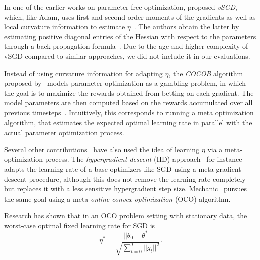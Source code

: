 \documentclass[letterpaper]{article} %
\begin{document}
In one of the earlier works on parameter-free optimization, \citet{schaulNoMorePesky2013} proposed \textit{vSGD}, which, like Adam, uses first and second order moments of the gradients as well as local curvature information to estimate $\eta$~\cite{schaulNoMorePesky2013}.
The authors obtain the latter by estimating positive diagonal entries of the Hessian with respect to the parameters through a back-propagation formula~\cite{schaulNoMorePesky2013}.
Due to the age and higher complexity of vSGD compared to similar approaches, we did not include it in our evaluations.

Instead of using curvature information for adapting $\eta$, the \textit{COCOB} algorithm proposed by~\citet{orabonaTrainingDeepNetworks2017} models parameter optimization as a gambling problem, in which the goal is to maximize the rewards obtained from betting on each gradient.
The model parameters are then computed based on the rewards accumulated over all previous timesteps~\cite{orabonaTrainingDeepNetworks2017}.
Intuitively, this corresponds to running a meta optimization algorithm, that estimates the expected optimal learning rate in parallel with the actual parameter optimization process.

Several other contributions~\cite{vanervenMetaGradMultipleLearning2016a,baydinOnlineLearningRate2018,cutkoskyMechanicLearningRate2023} have also used the idea of learning $\eta$ via a meta-optimization process.
The \textit{hypergradient descent} (HD) approach~\cite{baydinOnlineLearningRate2018} for instance adapts the learning rate of a base optimizers like SGD using a meta-gradient descent procedure, although this does not remove the learning rate completely but replaces it with a less sensitive hypergradient step size.
Mechanic~\cite{cutkoskyMechanicLearningRate2023} pursues the same goal using a meta \textit{online convex optimization} (OCO) algorithm.

Research has shown that in an OCO problem setting with stationary data, the worst-case optimal fixed learning rate for SGD is
\begin{equation}\label{eq:oco_optimal_lr}
	\eta^* = \frac{||\theta_0 - \theta^*||}{\sqrt{\sum_{t=0}^{T} ||g_t||^2}}.
\end{equation}
\end{document}
